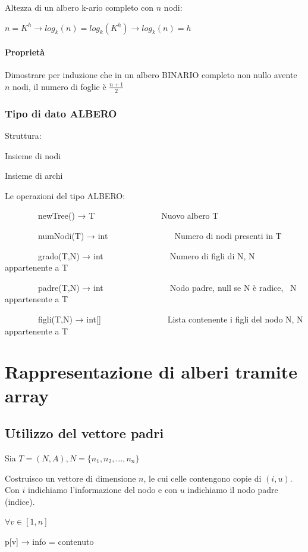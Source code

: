 \documentclass[tikz]{article}
\let\oldparagraph\paragraph
\renewcommand{\paragraph}[1]{\oldparagraph{#1}\mbox{}}
\begin{document}
{{{Altezza di un albero k-ario completo con $n$ nodi:}

$n=K^h \rightarrow log_k(n) = log_k(K^h) \rightarrow log_k(n) = h$

\paragraph{Proprietà}

{Dimostrare per induzione che in un albero BINARIO completo non nullo avente $n$ nodi, il numero di foglie è $\frac{n+1}{2}$}

\subsubsection{Tipo di dato ALBERO}

{Struttura:}

{Insieme di nodi}

{Insieme di archi}


{Le operazioni del tipo ALBERO:}


{~~~~~~~~newTree() → T~~~~~~~~~~~~~~~~Nuovo albero T}

{~~~~~~~~numNodi(T) → int~~~~~~~~~~~~~~~~Numero di nodi presenti in T}

{~~~~~~~~grado(T,N) → int~~~~~~~~~~~~~~~~Numero di figli di N, N
appartenente a T}

{~~~~~~~~padre(T,N) → int~~~~~~~~~~~~~~~~Nodo padre, null se N è radice,
~N appartenente a T}

{~~~~~~~~figli(T,N) → int{[}{]}~~~~~~~~~~~~~~~~Lista contenente i figli
del nodo N, N appartenente a T}

{}

\section{Rappresentazione di alberi tramite array}

\subsection{Utilizzo del vettore padri}

{Sia $T=(N,A), N = \{n_1,n_2,\ldots,n_n\}$}

{Costruisco un vettore di dimensione $n$, le cui celle contengono copie di $(i,u)$. Con $i$ indichiamo l'informazione del nodo e con $u$ indichiamo il nodo padre (indice).}

$\forall v \in [1,n]$

{p{[}v{]} → info = contenuto}

}}
\end{document}

